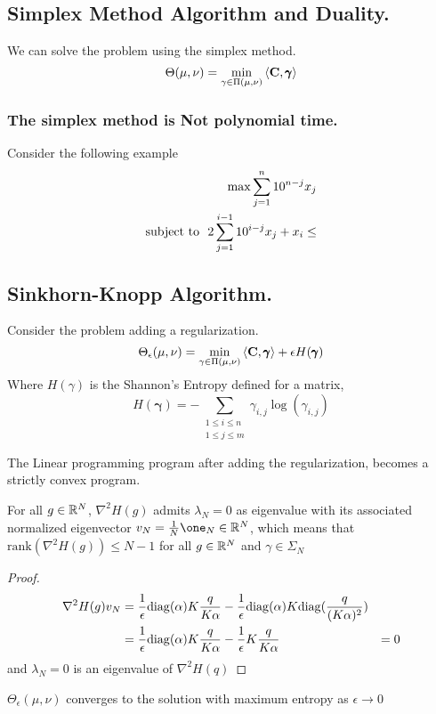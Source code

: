 \subsection{Simplex Method Algorithm and Duality.}
We can solve the problem using the simplex method.
\begin{equation}
	\Theta(\mu, \nu)=\min_{\gamma\in \Pi(\mu, \nu)}{\left\langle \mathbf{C}, \pmb{\gamma} \right\rangle}
\end{equation}
\subsubsection{The simplex method is Not polynomial time.}
Consider the following example
\begin{align}
	\max \sum_{j=1}^{n} 10^{n-j}x_j\\
	\text{subject to }\ 2\sum_{j=1}^{i-1}10^{i-j}x_j+x_i \leq 
\end{align}

\subsection{Sinkhorn-Knopp Algorithm.}
Consider the problem adding a regularization.
\begin{equation}
	\Theta_\epsilon(\mu, \nu)=\min_{\gamma\in \Pi(\mu, \nu)}{\left\langle \mathbf{C},\pmb{\gamma} \right\rangle+\epsilon H(\pmb{\gamma})}
\end{equation}
Where $H(\gamma)$ is the Shannon's Entropy defined for a matrix,
\begin{equation}
	H(\pmb{\gamma})=-\sum_{\substack{1\leq i \leq n\\ 1\leq j \leq m}}\gamma_{i,j}\log(\gamma_{i,j})
\end{equation} 

\begin{theorem}
	The Linear programming program after adding the regularization, becomes a strictly convex program.
\end{theorem}
\begin{lemma}
	For all $g\in \mathbb{R}^N$, $\nabla^2 H(g)$ admits $\lambda_N=0$ as eigenvalue with its associated normalized eigenvector $v_N= \frac{1}{N}\one_N\in \Real^N$, which means that $\mathrm{rank}(\nabla^2 H(g))\leq N-1$ for all $g\in \mathbb{R}^N$ and $\gamma\in \Sigma_N$
\end{lemma}
\begin{proof}
\begin{align*}
	\nabla^2 H(g) v_N &=\frac{1}{\epsilon}\mathrm{diag}(\alpha)K\frac{q}{K\alpha}-\frac{1}{\epsilon}\mathrm{diag}(\alpha)K\mathrm{diag}(\frac{q}{(K\alpha)^2})\\
	&=\frac{1}{\epsilon}\mathrm{diag}(\alpha)K\frac{q}{K\alpha}-\frac{1}{\epsilon}K\frac{q}{K\alpha}
	&=0
\end{align*}
and $\lambda_N=0$ is an eigenvalue of $\nabla^2H(q)$
\end{proof}
\begin{theorem}
	$\Theta_\epsilon(\mu, \nu)$ converges to the solution with maximum entropy as $\epsilon\rightarrow 0$
\end{theorem}
